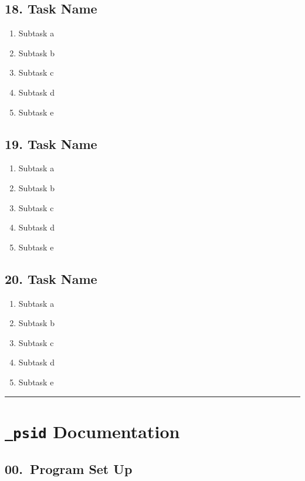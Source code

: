 \documentclass[12pt]{article}
\begin{document}
\subsection*{18. Task Name}
\begin{enumerate}[label=\alph*.]
    \item Subtask a
    \item Subtask b
    \item Subtask c
    \item Subtask d
    \item Subtask e
\end{enumerate}

\subsection*{19. Task Name}
\begin{enumerate}[label=\alph*.]
    \item Subtask a
    \item Subtask b
    \item Subtask c
    \item Subtask d
    \item Subtask e
\end{enumerate}

\subsection*{20. Task Name}
\begin{enumerate}[label=\alph*.]
    \item Subtask a
    \item Subtask b
    \item Subtask c
    \item Subtask d
    \item Subtask e
\end{enumerate}







\bigskip\noindent\rule{\textwidth}{0.4pt}\bigskip

\section*{\texttt{\_psid} Documentation}

\subsection*{00.\ Program Set Up}
\end{document}
